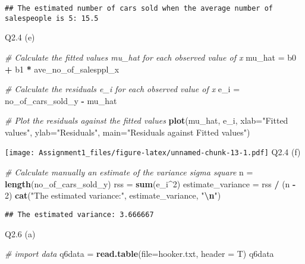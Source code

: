 \documentclass[
]{article}
\newenvironment{Shaded}{\begin{snugshade}}{\end{snugshade}}
\newcommand{\AttributeTok}[1]{\textcolor[rgb]{0.13,0.29,0.53}{#1}}
\newcommand{\CommentTok}[1]{\textcolor[rgb]{0.56,0.35,0.01}{\textit{#1}}}
\newcommand{\DecValTok}[1]{\textcolor[rgb]{0.00,0.00,0.81}{#1}}
\newcommand{\FunctionTok}[1]{\textcolor[rgb]{0.13,0.29,0.53}{\textbf{#1}}}
\newcommand{\NormalTok}[1]{#1}
\newcommand{\OtherTok}[1]{\textcolor[rgb]{0.56,0.35,0.01}{#1}}
\newcommand{\SpecialCharTok}[1]{\textcolor[rgb]{0.81,0.36,0.00}{\textbf{#1}}}
\newcommand{\StringTok}[1]{\textcolor[rgb]{0.31,0.60,0.02}{#1}}
\begin{document}
\begin{verbatim}
## The estimated number of cars sold when the average number of salespeople is 5: 15.5
\end{verbatim}

Q2.4 (e)

\begin{Shaded}
\begin{Highlighting}[]
\CommentTok{\# Calculate the fitted values mu\_hat for each observed value of x}
\NormalTok{mu\_hat }\OtherTok{=}\NormalTok{ b0 }\SpecialCharTok{+}\NormalTok{ b1 }\SpecialCharTok{*}\NormalTok{ ave\_no\_of\_salesppl\_x}

\CommentTok{\# Calculate the residuals e\_i for each observed value of x}
\NormalTok{e\_i }\OtherTok{=}\NormalTok{ no\_of\_cars\_sold\_y }\SpecialCharTok{{-}}\NormalTok{ mu\_hat}

\CommentTok{\# Plot the residuals against the fitted values}
\FunctionTok{plot}\NormalTok{(mu\_hat, e\_i, }\AttributeTok{xlab=}\StringTok{"Fitted values"}\NormalTok{, }\AttributeTok{ylab=}\StringTok{"Residuals"}\NormalTok{, }\AttributeTok{main=}\StringTok{"Residuals against Fitted values"}\NormalTok{)}
\end{Highlighting}
\end{Shaded}

\texttt{[image: Assignment1\_files/figure-latex/unnamed-chunk-13-1.pdf]}
Q2.4 (f)

\begin{Shaded}
\begin{Highlighting}[]
\CommentTok{\# Calculate manually an estimate of the variance sigma square}
\NormalTok{n }\OtherTok{=} \FunctionTok{length}\NormalTok{(no\_of\_cars\_sold\_y)}
\NormalTok{rss }\OtherTok{=} \FunctionTok{sum}\NormalTok{(e\_i}\SpecialCharTok{\^{}}\DecValTok{2}\NormalTok{)}
\NormalTok{estimate\_variance }\OtherTok{=}\NormalTok{ rss }\SpecialCharTok{/}\NormalTok{ (n }\SpecialCharTok{{-}} \DecValTok{2}\NormalTok{)}
\FunctionTok{cat}\NormalTok{(}\StringTok{"The estimated variance:"}\NormalTok{, estimate\_variance, }\StringTok{"}\SpecialCharTok{\textbackslash{}n}\StringTok{"}\NormalTok{)}
\end{Highlighting}
\end{Shaded}

\begin{verbatim}
## The estimated variance: 3.666667
\end{verbatim}

Q2.6 (a)

\begin{Shaded}
\begin{Highlighting}[]
\CommentTok{\# import data}
\NormalTok{q6data }\OtherTok{=} \FunctionTok{read.table}\NormalTok{(}\AttributeTok{file=}\StringTok{\textquotesingle{}hooker.txt\textquotesingle{}}\NormalTok{, }\AttributeTok{header =}\NormalTok{ T)}
\NormalTok{q6data}
\end{Highlighting}
\end{Shaded}
\end{document}
